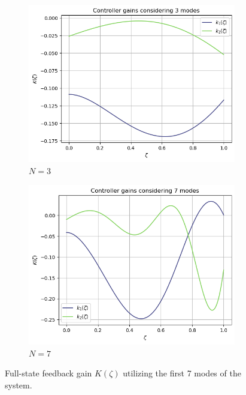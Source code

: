 \begin{figure}[H]
    \centering
    \begin{subfigure}[b]{0.45\textwidth}
        \centering
        \includegraphics[width=\textwidth]{Figures/k_3.png}
        \caption{$N = 3$}
        \label{fig:k_3}
    \end{subfigure}
    \hfill
    \begin{subfigure}[b]{0.45\textwidth}
        \centering
        \includegraphics[width=\textwidth]{Figures/k_7.png}
        \caption{$N = 7$}
        \label{fig:k_7}
    \end{subfigure}
    \caption{Full-state feedback gain $K(\zeta)$ utilizing the first 7 modes of the system.}
    \label{fig:k_modes}
\end{figure}

